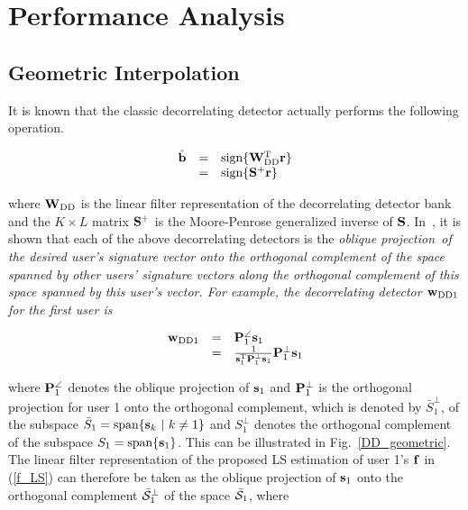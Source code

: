 \documentclass[a4paper,11pt,fleqn]{article}
\newcommand{\br}{{\mathbf r}}
\newcommand{\bb}{{\bf b}}
\newcommand{\bs}{{\bf s}}
\newcommand{\bw}{{\bf w}}
\newcommand{\bbf}{{\bf f}}
\newcommand{\bS}{{\bf S}}
\newcommand{\bP}{{\bf P}}
\newcommand{\bW}{{\bf W}}
\begin{document}
\pagebreak

\section{Performance Analysis}

\subsection{Geometric Interpolation}

It is known that the classic decorrelating detector actually
performs the following operation.

\begin{equation}
\begin{array}{rcl}
\hat\bb&=&\mbox{sign}\{\bW_{\rm DD}^{\rm T}\br\}\\
 &=&\mbox{sign}\{\bS^+\br\}
\end{array}
\end{equation}

\noindent where $\bW_{\rm DD}$ is the linear filter representation
of the decorrelating detector bank and the $K\times L$ matrix
$\bS^+$ is the Moore-Penrose generalized inverse of $\bS$.
In~\cite{Elda02}, it is shown that each of the above decorrelating
detectors is the \em oblique projection\rm\ of the desired user's
signature vector onto the orthogonal complement of the space
spanned by other users' signature vectors along the orthogonal
complement of this space spanned by this user's vector. For
example, the decorrelating detector $\bw_{\rm DD1}$ for the first
user is


\begin{equation}
\begin{array}{rcl}
\bw_{\rm DD1}&=&\bP_1^{\angle}\bs_1\\
 &=&{1 \over \bs_1^{\rm T}\bP_1^{\perp}\bs_1 }\bP_1^{\perp}\bs_1
\end{array}
\end{equation}

\noindent where $\bP_1^{\angle}$ denotes the oblique projection of
$\bs_1$ and $\bP_1^{\perp}$ is the orthogonal projection for user
1 onto the orthogonal complement, which is denoted by
$\bar{S}_1^{\perp}$, of the subspace
$\bar{S}_1=\mbox{span}\{\bs_k\ |\ k\neq 1\}$  and ${S}_1^{\perp}$
denotes the orthogonal complement of the subspace
$S_1=\mbox{span}\{\bs_1\}$. This can be illustrated in
Fig.~\ref{DD_geometric}. The linear filter representation of the
proposed LS estimation of user 1's $\bbf$ in (\ref{f_LS}) can
therefore be taken as the oblique projection of $\bs_1$ onto the
orthogonal complement $\bar{\cal S}_{1}^{\perp}$ of the space
$\bar{\cal S}_{1}$, where
\end{document}
